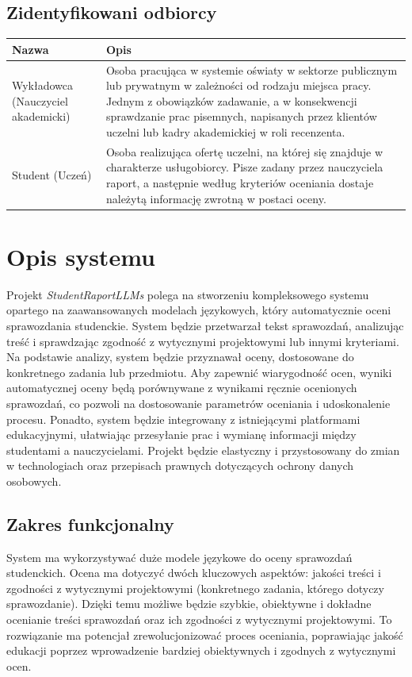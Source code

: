 \documentclass[a4paper, 12pt]{article}
\begin{document}
\subsection{Zidentyfikowani odbiorcy}

\begin{center}
\footnotesize
\begin{tabular}{|p{}|p{}|}
\hline
\textbf{Nazwa} & \textbf{Opis} \\
\hline
Wykładowca (Nauczyciel akademicki) & Osoba pracująca w systemie oświaty w sektorze publicznym lub prywatnym w zależności od rodzaju miejsca pracy. Jednym z obowiązków zadawanie, a w konsekwencji sprawdzanie prac pisemnych, napisanych przez klientów uczelni lub kadry akademickiej w roli recenzenta. \\
\hline
Student (Uczeń) & Osoba realizująca ofertę uczelni, na której się znajduje w charakterze usługobiorcy. Pisze zadany przez nauczyciela raport, a następnie według kryteriów oceniania dostaje należytą informację zwrotną w postaci oceny. \\
\hline
\end{tabular}
\end{center}

\section{Opis systemu}
Projekt \textit{StudentRaportLLMs} polega na stworzeniu kompleksowego systemu opartego na zaawansowanych modelach językowych, który automatycznie oceni sprawozdania studenckie. System będzie przetwarzał tekst sprawozdań, analizując treść i sprawdzając zgodność z wytycznymi projektowymi lub innymi kryteriami. Na podstawie analizy, system będzie przyznawał oceny, dostosowane do konkretnego zadania lub przedmiotu. Aby zapewnić wiarygodność ocen, wyniki automatycznej oceny będą porównywane z wynikami ręcznie ocenionych sprawozdań, co pozwoli na dostosowanie parametrów oceniania i udoskonalenie procesu. Ponadto, system będzie integrowany z istniejącymi platformami edukacyjnymi, ułatwiając przesyłanie prac i wymianę informacji między studentami a nauczycielami. Projekt będzie elastyczny i przystosowany do zmian w technologiach oraz przepisach prawnych dotyczących ochrony danych osobowych.
\subsection{Zakres funkcjonalny}

System ma wykorzystywać duże modele językowe do oceny sprawozdań studenckich.
Ocena ma dotyczyć dwóch kluczowych aspektów: jakości treści i zgodności z wytycznymi projektowymi (konkretnego zadania,
którego dotyczy sprawozdanie).
Dzięki temu możliwe będzie szybkie, obiektywne i dokładne ocenianie treści sprawozdań oraz ich zgodności z wytycznymi projektowymi.
To rozwiązanie ma potencjał zrewolucjonizować proces oceniania, poprawiając jakość edukacji poprzez wprowadzenie bardziej obiektywnych i zgodnych z wytycznymi ocen.
\end{document}
